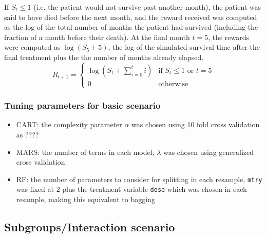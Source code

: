 \documentclass[12pt]{article}
\begin{document}
If $S_{t} \leq 1$ (i.e. the patient would not survive past another month), the patient was said to have died before the next month, and the reward received was computed as the log of the total number of months the patient had survived (including the fraction of a month before their death). At the final month $t = 5$, the rewards were computed as $\log(S_{5} + 5)$, the log of the simulated survival time after the final treatment plus the the number of months already elapsed. 
\begin{equation}
  R_{t + 1} = \begin{cases}
    \log(S_{t} + \sum_{i = 0}^{t} i) & \text{if } S_{t} \leq 1 \text{ or } t = 5 \\
    0 & \text{otherwise}
  \end{cases}
\end{equation}

\subsubsection{Tuning parameters for basic scenario} %
\label{ssub:tuning_parameters_for_basic_scenario}

\begin{itemize}
  \item CART: the complexity parameter $\alpha$ was chosen using 10 fold cross validation as ????
  \item MARS: the number of terms in each model, $\lambda$ was chosen using generalized cross validation
  \item RF: the number of parameters to consider for splitting in each resample, \texttt{mtry} was fixed at 2 plus the treatment variable \texttt{dose} which was chosen in each resample, making this equivalent to bagging
\end{itemize}




\subsection{Subgroups/Interaction scenario} %
\label{sub:subgroups_interaction}
\end{document}
